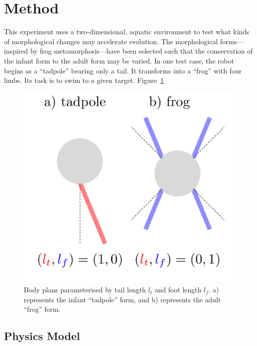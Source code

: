 \section{Method}

This experiment uses a two-dimensional, aquatic environment to test
what kinds of morphological changes may accelerate evolution. The
morphological forms---inspired by frog metamorphosis---have been
selected such that the conservation of the infant form to the adult
form may be varied. In one test case, the robot begins as a
``tadpole'' bearing only a tail. It transforms into a ``frog'' with
four limbs. Its task is to swim to a given target.   Figure~\ref{morphology}

\begin{figure}[h]\label{morphology}
  \begin{center} 
    \includegraphics[scale=0.5]{fig/forms.pdf} 
  \end{center} 
  \caption[Body plans]{Body plans parameterised by tail length $l_t$ and foot
    length $l_f$. a) represents the infant ``tadpole'' form, and b)
    represents the adult ``frog'' form. }
  
\end{figure}

\subsection{Physics Model}

